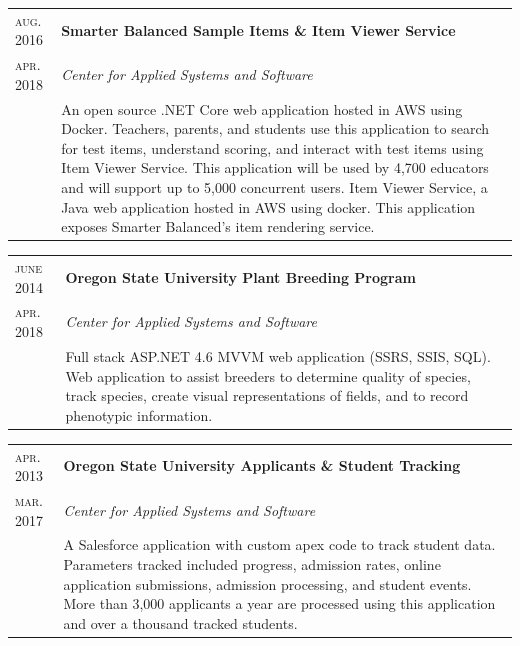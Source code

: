 \documentclass[10pt]{article}
\newenvironment{sectiontable}{ \begin{tabular}{p{16mm}|p{16cm}} }{ \end{tabular} }
\begin{document}
\begin{sectiontable}
{\small\textsc{aug. 2016}} 	& \textbf{Smarter Balanced Sample Items \& Item Viewer Service}\\
{\small\textsc{apr. 2018}}  & \emph{Center for Applied Systems and Software}\\
					& \rule{0pt}{2.3ex}\noindent    
An open source .NET Core web application hosted in AWS using Docker. \newline
Teachers, parents, and students use this application to search for test items, understand scoring, and interact with test items using Item Viewer Service. This application will be used by 4,700 educators and will support up to 5,000 concurrent users.
Item Viewer Service, a Java web application hosted in AWS using docker. This application exposes Smarter Balanced's item rendering service.
\end{sectiontable} 


\begin{sectiontable}
{\small\textsc{june 2014}} 	& \textbf{Oregon State University Plant Breeding Program}\\
{\small\textsc{apr. 2018}}  & \emph{Center for Applied Systems and Software}\\
					& \rule{0pt}{2.3ex}\noindent    
Full stack ASP.NET 4.6 MVVM web application (SSRS, SSIS, SQL). \newline
Web application to assist breeders to determine quality of species, track species, create visual representations of fields, and to record phenotypic information. 
\end{sectiontable} 

\begin{sectiontable}
{\small\textsc{apr. 2013}} 	& \textbf{Oregon State University Applicants \& Student Tracking}\\
{\small\textsc{mar. 2017}}  & \emph{Center for Applied Systems and Software}\\
					& \rule{0pt}{2.3ex}\noindent    
A Salesforce application with custom apex code to track student data. \newline 
Parameters tracked included progress, admission rates, online application submissions, admission processing, and student events. More than 3,000 applicants a year are processed using this application and over a thousand tracked students.
\end{sectiontable} 
\end{document}
